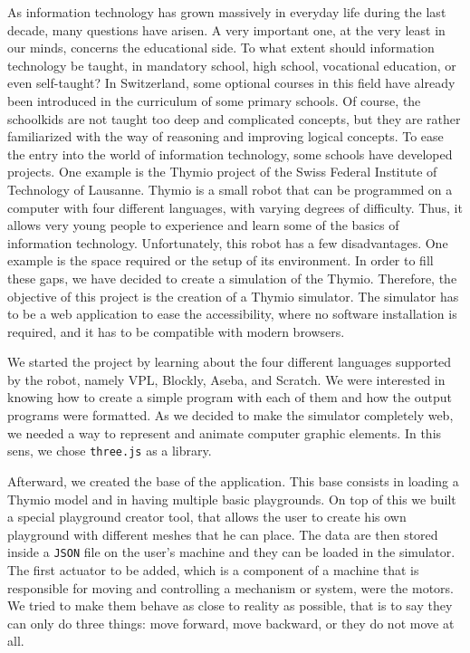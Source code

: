 \documentclass{scrreprt}
\begin{document}
As information technology has grown massively in everyday life during the last decade, many questions have arisen. A very important one, at the very least in our minds, concerns the educational side. 
To what extent should information technology be taught, in mandatory school, high school, vocational education, or even self-taught? In Switzerland, some optional courses in this field have already been introduced in the curriculum of some primary schools. 
Of course, the schoolkids are not taught too deep and complicated concepts, but they are rather familiarized with the way of reasoning and improving logical concepts. To ease the entry into the world of information technology, some schools have developed projects. 
One example is the Thymio project of the Swiss Federal Institute of Technology of Lausanne. Thymio is a small robot that can be programmed on a computer with four different languages, with varying degrees of difficulty. 
Thus, it allows very young people to experience and learn some of the basics of information technology. Unfortunately, this robot has a few disadvantages. One example is the space required or the setup of its environment. 
In order to fill these gaps, we have decided to create a simulation of the Thymio.
Therefore, the objective of this project is the creation of a Thymio simulator. The simulator has to be a web application to ease the accessibility, where no software installation is required, and it has to be compatible with modern browsers.

We started the project by learning about the four different languages supported by the robot, namely VPL, Blockly, Aseba, and Scratch. We were interested in knowing how to create a simple program with each of them and how the output programs were formatted. 
As we decided to make the simulator completely web, we needed a way to represent and animate computer graphic elements. In this sens, we chose \texttt{three.js} as a library.

Afterward, we created the base of the application. This base consists in loading a Thymio model and in having multiple basic playgrounds. On top of this we built a special playground creator tool, that allows the user to create his own playground with different meshes that he can place. 
The data are then stored inside a \texttt{JSON} file on the user's machine and they can be loaded in the simulator. The first actuator to be added, which is a component of a machine that is responsible for moving and controlling a mechanism or system, 
were the motors. We tried to make them behave as close to reality as possible, that is to say they can only do three things: move forward, move backward, or they do not move at all.
\end{document}
